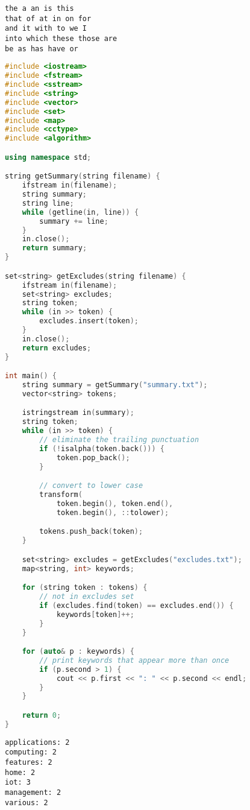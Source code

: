 \begin{lstlisting}[title=excludes.txt]
the a an is this
that of at in on for
and it with to we I
into which these those are
be as has have or
\end{lstlisting}

\begin{lstlisting}[language=C++, title=STL\_set\_map.cpp]
#include <iostream>
#include <fstream>
#include <sstream>
#include <string>
#include <vector>
#include <set>
#include <map>
#include <cctype>
#include <algorithm>

using namespace std;

string getSummary(string filename) {
	ifstream in(filename);
	string summary;
	string line;
	while (getline(in, line)) {
		summary += line;
	}
	in.close();
	return summary;
}

set<string> getExcludes(string filename) {
	ifstream in(filename);
	set<string> excludes;
	string token;
	while (in >> token) {
		excludes.insert(token);
	}
	in.close();
	return excludes;
}

int main() {
	string summary = getSummary("summary.txt");
	vector<string> tokens;

	istringstream in(summary);
	string token;
	while (in >> token) {
		// eliminate the trailing punctuation
		if (!isalpha(token.back())) {
			token.pop_back();
		}

		// convert to lower case
		transform(
			token.begin(), token.end(),
			token.begin(), ::tolower);

		tokens.push_back(token);
	}

	set<string> excludes = getExcludes("excludes.txt");
	map<string, int> keywords;

	for (string token : tokens) {
		// not in excludes set
		if (excludes.find(token) == excludes.end()) {
			keywords[token]++;
		}
	}

	for (auto& p : keywords) {
		// print keywords that appear more than once
		if (p.second > 1) {
			cout << p.first << ": " << p.second << endl;
		}
	}

	return 0;
}
\end{lstlisting}

\begin{tcolorbox}
	\begin{verbatim}
applications: 2
computing: 2
features: 2
home: 2
iot: 3
management: 2
various: 2
	\end{verbatim}
\end{tcolorbox}

\newpage

